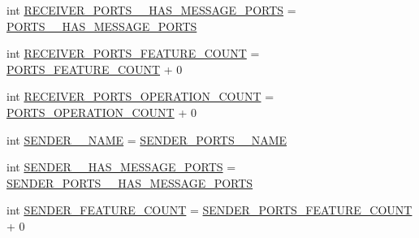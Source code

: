 \begin{DoxyCompactItemize}
int \hyperlink{interfaceshootingmachineemfmodel_1_1_shootingmachineemfmodel_package_a7c53dc7a94983b99dae80e1d58d045c9}{R\-E\-C\-E\-I\-V\-E\-R\-\_\-\-P\-O\-R\-T\-S\-\_\-\-\_\-\-H\-A\-S\-\_\-\-M\-E\-S\-S\-A\-G\-E\-\_\-\-P\-O\-R\-T\-S} = \hyperlink{interfaceshootingmachineemfmodel_1_1_shootingmachineemfmodel_package_abfa26d954e44f83dadd22a364a5ede44}{P\-O\-R\-T\-S\-\_\-\-\_\-\-H\-A\-S\-\_\-\-M\-E\-S\-S\-A\-G\-E\-\_\-\-P\-O\-R\-T\-S}
\item 
int \hyperlink{interfaceshootingmachineemfmodel_1_1_shootingmachineemfmodel_package_adc6b75b7f3724a924c94d2ac5cbbcb58}{R\-E\-C\-E\-I\-V\-E\-R\-\_\-\-P\-O\-R\-T\-S\-\_\-\-F\-E\-A\-T\-U\-R\-E\-\_\-\-C\-O\-U\-N\-T} = \hyperlink{interfaceshootingmachineemfmodel_1_1_shootingmachineemfmodel_package_a1ea63d8ed0fd32dbb04f8c83812629eb}{P\-O\-R\-T\-S\-\_\-\-F\-E\-A\-T\-U\-R\-E\-\_\-\-C\-O\-U\-N\-T} + 0
\item 
int \hyperlink{interfaceshootingmachineemfmodel_1_1_shootingmachineemfmodel_package_a784cd8ee08945f45f89ceb08f5a717e5}{R\-E\-C\-E\-I\-V\-E\-R\-\_\-\-P\-O\-R\-T\-S\-\_\-\-O\-P\-E\-R\-A\-T\-I\-O\-N\-\_\-\-C\-O\-U\-N\-T} = \hyperlink{interfaceshootingmachineemfmodel_1_1_shootingmachineemfmodel_package_a566f821cfd14b88ba5e0b60e966fb9f3}{P\-O\-R\-T\-S\-\_\-\-O\-P\-E\-R\-A\-T\-I\-O\-N\-\_\-\-C\-O\-U\-N\-T} + 0
\item 
int \hyperlink{interfaceshootingmachineemfmodel_1_1_shootingmachineemfmodel_package_a1ed828768d7bc69daa2e850c3d7dc8ac}{S\-E\-N\-D\-E\-R\-\_\-\-\_\-\-N\-A\-M\-E} = \hyperlink{interfaceshootingmachineemfmodel_1_1_shootingmachineemfmodel_package_a399a22f7885ad9687ceee392efd75115}{S\-E\-N\-D\-E\-R\-\_\-\-P\-O\-R\-T\-S\-\_\-\-\_\-\-N\-A\-M\-E}
\item 
int \hyperlink{interfaceshootingmachineemfmodel_1_1_shootingmachineemfmodel_package_a7e39218752c6badebdd62172a1e09cf9}{S\-E\-N\-D\-E\-R\-\_\-\-\_\-\-H\-A\-S\-\_\-\-M\-E\-S\-S\-A\-G\-E\-\_\-\-P\-O\-R\-T\-S} = \hyperlink{interfaceshootingmachineemfmodel_1_1_shootingmachineemfmodel_package_a32f9aba86ce59940c62b442308c4bf7d}{S\-E\-N\-D\-E\-R\-\_\-\-P\-O\-R\-T\-S\-\_\-\-\_\-\-H\-A\-S\-\_\-\-M\-E\-S\-S\-A\-G\-E\-\_\-\-P\-O\-R\-T\-S}
\item 
int \hyperlink{interfaceshootingmachineemfmodel_1_1_shootingmachineemfmodel_package_a8a9aaa95507322260fbb9649b67d5539}{S\-E\-N\-D\-E\-R\-\_\-\-F\-E\-A\-T\-U\-R\-E\-\_\-\-C\-O\-U\-N\-T} = \hyperlink{interfaceshootingmachineemfmodel_1_1_shootingmachineemfmodel_package_a9db4c8b36712714f6168acc0e9fae4fa}{S\-E\-N\-D\-E\-R\-\_\-\-P\-O\-R\-T\-S\-\_\-\-F\-E\-A\-T\-U\-R\-E\-\_\-\-C\-O\-U\-N\-T} + 0

\end{DoxyCompactItemize}
